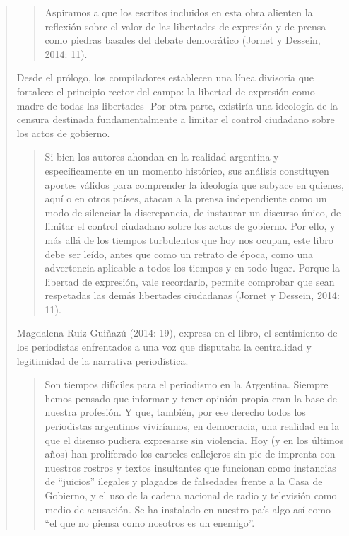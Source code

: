 \begin{quote}
\begin{quote}
	Aspiramos a que los escritos incluidos en esta obra alienten la reflexión sobre el valor de las libertades de expresión y de prensa como piedras basales del debate democrático (Jornet y Dessein, 2014: 11).
\end{quote}


Desde el prólogo, los compiladores establecen una línea divisoria que fortalece el principio rector del campo: la libertad de expresión como madre de todas las libertades- Por otra parte, existiría una ideología de la censura destinada fundamentalmente a limitar el control ciudadano sobre los actos de gobierno.

\begin{quote}
	Si bien los autores ahondan en la realidad argentina y específicamente en un momento histórico, sus análisis constituyen aportes válidos para comprender la ideología que subyace en quienes, aquí o en otros países, atacan a la prensa independiente como un modo de silenciar la discrepancia, de instaurar un discurso único, de limitar el control ciudadano sobre los actos de gobierno. Por ello, y más allá de los tiempos turbulentos que hoy nos ocupan, este libro debe ser leído, antes que como un retrato de época, como una advertencia aplicable a todos los tiempos y en todo lugar. Porque la libertad de expresión, vale recordarlo, permite comprobar que sean respetadas las demás libertades ciudadanas (Jornet y Dessein, 2014: 11).
\end{quote}


Magdalena Ruiz Guiñazú (2014: 19), expresa en el libro, el sentimiento de los periodistas enfrentados a una voz que disputaba la centralidad y legitimidad de la narrativa periodística.

\begin{quote}
	Son tiempos difíciles para el periodismo en la Argentina. Siempre hemos pensado que informar y tener opinión propia eran la base de nuestra profesión. Y que, también, por ese derecho todos los periodistas argentinos viviríamos, en democracia, una realidad en la que el disenso pudiera expresarse sin violencia. Hoy (y en los últimos años) han proliferado los carteles callejeros sin pie de imprenta con nuestros rostros y textos insultantes que funcionan como instancias de \enquote{juicios} ilegales y plagados de falsedades frente a la Casa de Gobierno, y el uso de la cadena nacional de radio y televisión como medio de acusación. Se ha instalado en nuestro país algo así como \enquote{el que no piensa como nosotros es un enemigo}.
\end{quote}



\end{quote}
